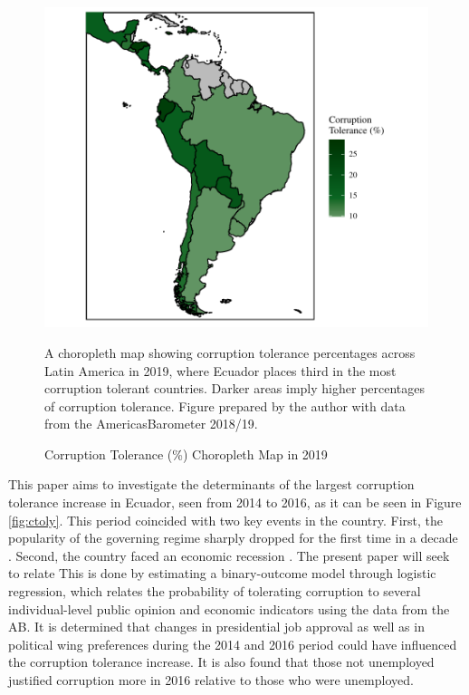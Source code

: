 \documentclass[12pt,a4]{article}
\begin{document}

\begin{figure}[htbp]
  \label{fig:ctolmap}
      \caption{Corruption Tolerance (\%) Choropleth Map in 2019}
    \begin{center}
    \includegraphics{images/ctol_map.pdf}
    \end{center}

A choropleth map showing corruption tolerance percentages across Latin America in 2019, where Ecuador places third in the most corruption tolerant countries. Darker areas imply higher percentages of corruption tolerance. Figure prepared by the author with data from the \textregistered AmericasBarometer 2018/19. 
\end{figure}

This paper aims to investigate the determinants of the largest corruption tolerance increase in Ecuador, seen from 2014 to 2016, as it can be seen in Figure \ref{fig:ctoly}. This period coincided with two key events in the country. First, the popularity of the governing regime sharply dropped for the first time in a decade \parencite{Quillupangui.2016}. Second, the country faced an economic recession \parencite{Weisbrot.2017}. The present paper will seek to relate  This is done by estimating a binary-outcome model through logistic regression, which relates the probability of tolerating corruption to several individual-level public opinion and economic indicators using the data from the AB. It is determined that changes in presidential job approval as well as in political wing preferences during the 2014 and 2016 period could have influenced the corruption tolerance increase. It is also found that those not unemployed justified corruption more in 2016 relative to those who were unemployed.
\end{document}
